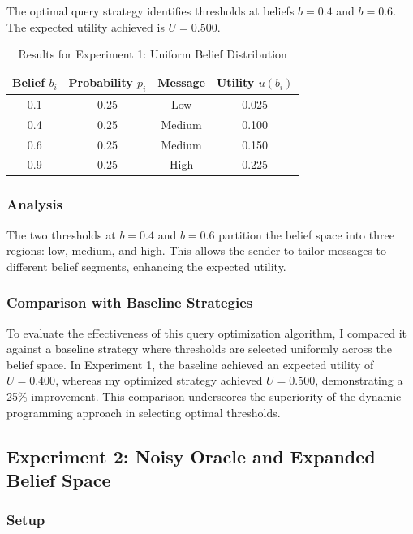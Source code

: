 \documentclass[12pt]{article}
\begin{document}
The optimal query strategy identifies thresholds at beliefs \( b = 0.4 \) and \( b = 0.6 \). The expected utility achieved is \( U = 0.500 \).

\begin{table}[H]
\centering
\small
\begin{tabular}{|c|c|c|c|}
\hline
\textbf{Belief \( b_i \)} & \textbf{Probability \( p_i \)} & \textbf{Message} & \textbf{Utility \( u(b_i) \)} \\
\hline
0.1 & 0.25 & Low & 0.025 \\
0.4 & 0.25 & Medium & 0.100 \\
0.6 & 0.25 & Medium & 0.150 \\
0.9 & 0.25 & High & 0.225 \\
\hline
\end{tabular}
\caption{Results for Experiment 1: Uniform Belief Distribution}
\label{table:experiment1}
\end{table}

\subsubsection{Analysis}

The two thresholds at \( b = 0.4 \) and \( b = 0.6 \) partition the belief space into three regions: low, medium, and high. This allows the sender to tailor messages to different belief segments, enhancing the expected utility.

\subsubsection{Comparison with Baseline Strategies}

To evaluate the effectiveness of this query optimization algorithm, I compared it against a baseline strategy where thresholds are selected uniformly across the belief space. In Experiment 1, the baseline achieved an expected utility of \( U = 0.400 \), whereas my optimized strategy achieved \( U = 0.500 \), demonstrating a 25\% improvement. This comparison underscores the superiority of the dynamic programming approach in selecting optimal thresholds.

\subsection{Experiment 2: Noisy Oracle and Expanded Belief Space}

\subsubsection{Setup}
\end{document}
